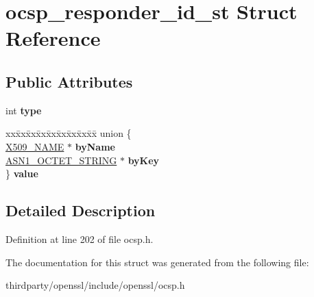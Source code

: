 \hypertarget{structocsp__responder__id__st}{}\section{ocsp\+\_\+responder\+\_\+id\+\_\+st Struct Reference}
\label{structocsp__responder__id__st}
\subsection*{Public Attributes}
\begin{DoxyCompactItemize}
\item 
\mbox{\label{structocsp__responder__id__st_a77bb04f705903d3d2e8c3b5671d6adc6}} 
int {\bfseries type}
\item 
\mbox{\label{structocsp__responder__id__st_a24ba051dd57a08349297ad54246556d5}} 
\begin{tabbing}
xx\=xx\=xx\=xx\=xx\=xx\=xx\=xx\=xx\=\kill
union \{\\
\>\hyperlink{struct_x509__name__st}{X509\_NAME} $\ast$ {\bfseries byName}\\
\>\hyperlink{structasn1__string__st}{ASN1\_OCTET\_STRING} $\ast$ {\bfseries byKey}\\
\} {\bfseries value}\\

\end{tabbing}\end{DoxyCompactItemize}


\subsection{Detailed Description}


Definition at line 202 of file ocsp.\+h.



The documentation for this struct was generated from the following file\+:\begin{DoxyCompactItemize}
\item 
thirdparty/openssl/include/openssl/ocsp.\+h\end{DoxyCompactItemize}
